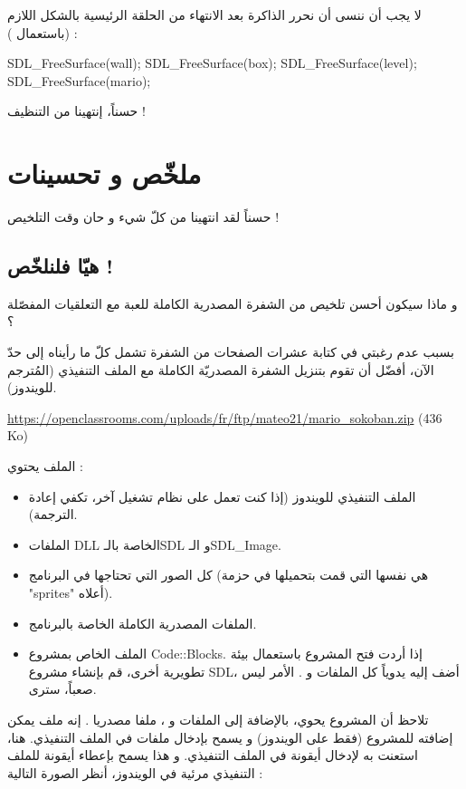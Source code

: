 لا يجب أن ننسى أن نحرر الذاكرة بعد الانتهاء من الحلقة الرئيسية بالشكل اللازم (باستعمال
) :

\begin{Csource}
SDL_FreeSurface(wall);
SDL_FreeSurface(box);
SDL_FreeSurface(level);
SDL_FreeSurface(mario);
\end{Csource}

حسناً، إنتهينا من التنظيف !

\section*{ملخّص و تحسينات}

حسناً لقد انتهينا من كلّ شيء و حان وقت التلخيص !

\subsection{هيّا فلنلخّص !}

و ماذا سيكون أحسن تلخيص من الشفرة المصدرية الكاملة للعبة مع التعلقيات المفصّلة ؟

بسبب عدم رغبتي في كتابة عشرات الصفحات من الشفرة تشمل كلّ ما رأيناه إلى حدّ الآن، أفضّل أن تقوم بتنزيل الشفرة المصدريّة الكاملة مع الملف التنفيذي (المُترجم للويندوز).

\textenglish{\url{https://openclassrooms.com/uploads/fr/ftp/mateo21/mario_sokoban.zip} (436 Ko)}

الملف
يحتوي :

\begin{itemize}
	\item الملف التنفيذي للويندوز (إذا كنت تعمل على نظام تشغيل آخر، تكفي إعادة الترجمة).
	\item الملفات
	\textenglish{DLL}
	الخاصة بالـ\textenglish{SDL}
	و الـ\textenglish{SDL\_Image}.
	\item كل الصور التي تحتاجها في البرنامج (هي نفسها التي قمت بتحميلها في حزمة
	"\textenglish{sprites}"
	أعلاه).
	\item الملفات المصدرية الكاملة الخاصة بالبرنامج.
	\item الملف
	الخاص بمشروع 
	\textenglish{Code::Blocks}.
	إذا أردت فتح المشروع باستعمال بيئة تطويرية أخرى، قم بإنشاء مشروع 
	\textenglish{SDL}،
	أضف إليه يدوياً كل الملفات
	و
	.
	الأمر ليس صعباً، سترى.
\end{itemize}

تلاحظ أن المشروع يحوي، بالإضافة إلى الملفات
و
،
ملفا مصدريا
.
إنه ملف يمكن إضافته للمشروع (فقط على الويندوز) و يسمح بإدخال ملفات في الملف التنفيذي. هنا، استعنت به لإدخال أيقونة في الملف التنفيذي. و هذا يسمح بإعطاء أيقونة للملف التنفيذي مرئية في الويندوز، أنظر الصورة التالية :

